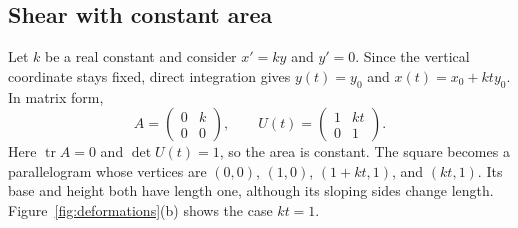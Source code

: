 \documentclass[a4paper,11pt]{article}
\DeclareMathOperator{\tr}{tr}
\numberwithin{equation}{section}
\begin{document}
\subsection{Shear with constant area}
\label{sec:shear}

Let $k$ be a real constant and consider $x'=ky$ and $y'=0$. Since the
vertical coordinate stays fixed, direct integration gives
$y(t)=y_0$ and $x(t)=x_0+kty_0$. In matrix form,
\begin{equation}
  A=\begin{pmatrix}0&k\\0&0\end{pmatrix},
  \qquad U(t)=\begin{pmatrix}1&kt\\0&1\end{pmatrix}.
  \label{eq:shear}
\end{equation}
Here $\tr A=0$ and $\det U(t)=1$, so the area is constant. The square
becomes a parallelogram whose vertices are $(0,0)$, $(1,0)$,
$(1+kt,1)$, and $(kt,1)$. Its base and height both have length one,
although its sloping sides change length. Figure~\ref{fig:deformations}(b)
shows the case $kt=1$.
\end{document}

